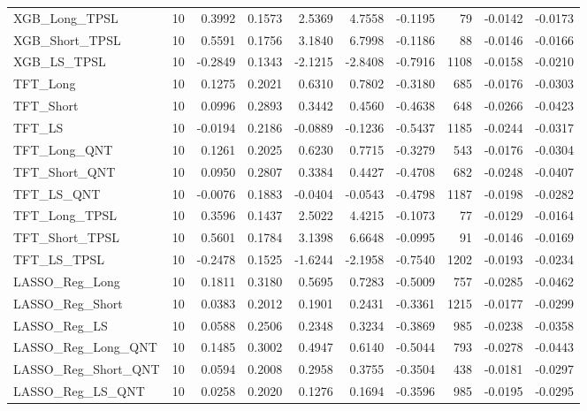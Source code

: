 \begin{tabular}{llrrrrrrrr}
\cline{1-10}
XGB\_Long\_TPSL & 10 & 0.3992 & 0.1573 & 2.5369 & 4.7558 & -0.1195 & 79 & -0.0142 & -0.0173 \\
\cline{1-10}
XGB\_Short\_TPSL & 10 & 0.5591 & 0.1756 & 3.1840 & 6.7998 & -0.1186 & 88 & -0.0146 & -0.0166 \\
\cline{1-10}
XGB\_LS\_TPSL & 10 & -0.2849 & 0.1343 & -2.1215 & -2.8408 & -0.7916 & 1108 & -0.0158 & -0.0210 \\
\cline{1-10}
TFT\_Long & 10 & 0.1275 & 0.2021 & 0.6310 & 0.7802 & -0.3180 & 685 & -0.0176 & -0.0303 \\
\cline{1-10}
TFT\_Short & 10 & 0.0996 & 0.2893 & 0.3442 & 0.4560 & -0.4638 & 648 & -0.0266 & -0.0423 \\
\cline{1-10}
TFT\_LS & 10 & -0.0194 & 0.2186 & -0.0889 & -0.1236 & -0.5437 & 1185 & -0.0244 & -0.0317 \\
\cline{1-10}
TFT\_Long\_QNT & 10 & 0.1261 & 0.2025 & 0.6230 & 0.7715 & -0.3279 & 543 & -0.0176 & -0.0304 \\
\cline{1-10}
TFT\_Short\_QNT & 10 & 0.0950 & 0.2807 & 0.3384 & 0.4427 & -0.4708 & 682 & -0.0248 & -0.0407 \\
\cline{1-10}
TFT\_LS\_QNT & 10 & -0.0076 & 0.1883 & -0.0404 & -0.0543 & -0.4798 & 1187 & -0.0198 & -0.0282 \\
\cline{1-10}
TFT\_Long\_TPSL & 10 & 0.3596 & 0.1437 & 2.5022 & 4.4215 & -0.1073 & 77 & -0.0129 & -0.0164 \\
\cline{1-10}
TFT\_Short\_TPSL & 10 & 0.5601 & 0.1784 & 3.1398 & 6.6648 & -0.0995 & 91 & -0.0146 & -0.0169 \\
\cline{1-10}
TFT\_LS\_TPSL & 10 & -0.2478 & 0.1525 & -1.6244 & -2.1958 & -0.7540 & 1202 & -0.0193 & -0.0234 \\
\cline{1-10}
LASSO\_Reg\_Long & 10 & 0.1811 & 0.3180 & 0.5695 & 0.7283 & -0.5009 & 757 & -0.0285 & -0.0462 \\
\cline{1-10}
LASSO\_Reg\_Short & 10 & 0.0383 & 0.2012 & 0.1901 & 0.2431 & -0.3361 & 1215 & -0.0177 & -0.0299 \\
\cline{1-10}
LASSO\_Reg\_LS & 10 & 0.0588 & 0.2506 & 0.2348 & 0.3234 & -0.3869 & 985 & -0.0238 & -0.0358 \\
\cline{1-10}
LASSO\_Reg\_Long\_QNT & 10 & 0.1485 & 0.3002 & 0.4947 & 0.6140 & -0.5044 & 793 & -0.0278 & -0.0443 \\
\cline{1-10}
LASSO\_Reg\_Short\_QNT & 10 & 0.0594 & 0.2008 & 0.2958 & 0.3755 & -0.3504 & 438 & -0.0181 & -0.0297 \\
\cline{1-10}
LASSO\_Reg\_LS\_QNT & 10 & 0.0258 & 0.2020 & 0.1276 & 0.1694 & -0.3596 & 985 & -0.0195 & -0.0295 \\

\end{tabular}
